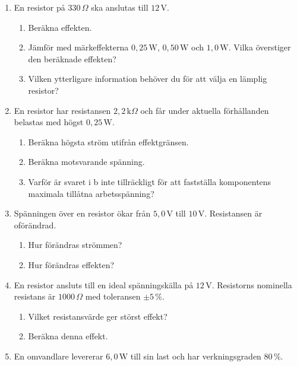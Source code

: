 \documentclass[
  swedish,
  11pt,
  a4paper,
  DIV=11,
  numbers=noendperiod,
  twoside,
  open=any]{scrreprt}
\begin{document}
\begin{enumerate}
\def\labelenumi{\arabic{enumi}.}
\setcounter{enumi}{14}
\item
  En resistor på \(330\,\Omega\) ska anslutas till \(12\,\mathrm{V}\).

  \begin{enumerate}
  \def\labelenumii{\alph{enumii}.}
  \item
    Beräkna effekten.
  \item
    Jämför med märkeffekterna \(0{,}25\,\mathrm{W}\),
    \(0{,}50\,\mathrm{W}\) och \(1{,}0\,\mathrm{W}\). Vilka överstiger
    den beräknade effekten?
  \item
    Vilken ytterligare information behöver du för att välja en lämplig
    resistor?
  \end{enumerate}
\item
  En resistor har resistansen \(2{,}2\,\mathrm{k}\Omega\) och får under
  aktuella förhållanden belastas med högst \(0{,}25\,\mathrm{W}\).

  \begin{enumerate}
  \def\labelenumii{\alph{enumii}.}
  \item
    Beräkna högsta ström utifrån effektgränsen.
  \item
    Beräkna motsvarande spänning.
  \item
    Varför är svaret i b inte tillräckligt för att fastställa
    komponentens maximala tillåtna arbetsspänning?
  \end{enumerate}
\item
  Spänningen över en resistor ökar från \(5{,}0\,\mathrm{V}\) till
  \(10\,\mathrm{V}\). Resistansen är oförändrad.

  \begin{enumerate}
  \def\labelenumii{\alph{enumii}.}
  \item
    Hur förändras strömmen?
  \item
    Hur förändras effekten?
  \end{enumerate}
\item
  En resistor ansluts till en ideal spänningskälla på
  \(12\,\mathrm{V}\). Resistorns nominella resistans är \(1000\,\Omega\)
  med toleransen \(\pm 5\,\%\).

  \begin{enumerate}
  \def\labelenumii{\alph{enumii}.}
  \item
    Vilket resistansvärde ger störst effekt?
  \item
    Beräkna denna effekt.
  \end{enumerate}
\item
  En omvandlare levererar \(6{,}0\,\mathrm{W}\) till sin last och har
  verkningsgraden \(80\,\%\).


\end{enumerate}
\end{document}
